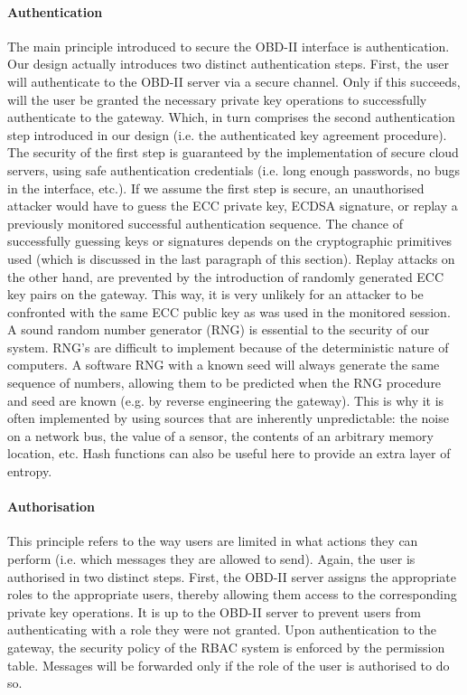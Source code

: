 \paragraph{Authentication} The main principle introduced to secure the OBD-II interface is authentication. Our design actually introduces two distinct authentication steps. First, the user will authenticate to the OBD-II server via a secure channel. Only if this succeeds, will the user be granted the necessary private key operations to successfully authenticate to the gateway. Which, in turn comprises the second authentication step introduced in our design (i.e. the authenticated key agreement procedure). The security of the first step is guaranteed by the implementation of secure cloud servers, using safe authentication credentials (i.e. long enough passwords, no bugs in the interface, etc.). If we assume the first step is secure, an unauthorised attacker would have to guess the ECC private key, ECDSA signature, or replay a previously monitored successful authentication sequence. The chance of successfully guessing keys or signatures depends on the cryptographic primitives used (which is discussed in the last paragraph of this section). Replay attacks on the other hand, are prevented by the introduction of randomly generated ECC key pairs on the gateway. This way, it is very unlikely for an attacker to be confronted with the same ECC public key as was used in the monitored session. A sound random number generator (RNG) is essential to the security of our system. RNG's are difficult to implement because of the deterministic nature of computers. A software RNG with a known seed will always generate the same sequence of numbers, allowing them to be predicted when the RNG procedure and seed are known (e.g. by reverse engineering the gateway). This is why it is often implemented by using sources that are inherently unpredictable: the noise on a network bus, the value of a sensor, the contents of an arbitrary memory location, etc. Hash functions can also be useful here to provide an extra layer of entropy. 

\paragraph{Authorisation} This principle refers to the way users are limited in what actions they can perform (i.e. which messages they are allowed to send). Again, the user is authorised in two distinct steps. First, the OBD-II server assigns the appropriate roles to the appropriate users, thereby allowing them access to the corresponding private key operations. It is up to the OBD-II server to prevent users from authenticating with a role they were not granted. Upon authentication to the gateway, the security policy of the RBAC system is enforced by the permission table. Messages will be forwarded only if the role of the user is authorised to do so. 

